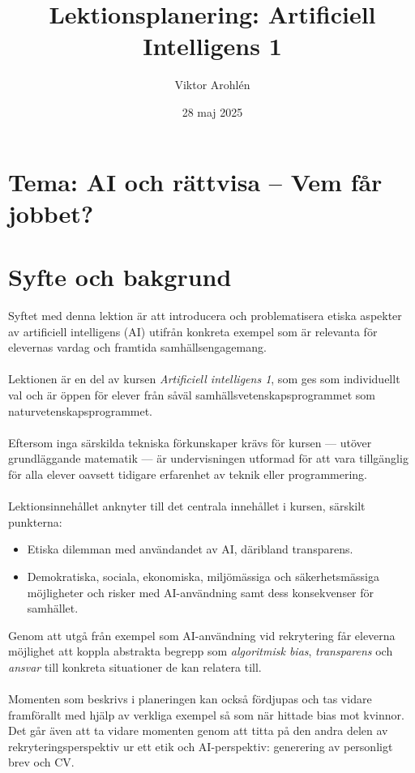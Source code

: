 \documentclass[12pt]{article}
\title{Lektionsplanering: Artificiell Intelligens 1}
\author{Viktor Arohlén}
\date{28 maj 2025}
\begin{document}
\maketitle

\section*{Tema: AI och rättvisa – Vem får jobbet?}

\section*{Syfte och bakgrund}

Syftet med denna lektion är att introducera och problematisera etiska aspekter av 
artificiell intelligens (AI) utifrån konkreta exempel som är relevanta för elevernas 
vardag och framtida samhällsengagemang.
\\\\
Lektionen är en del av kursen \textit{Artificiell intelligens 1}, som ges som 
individuellt val och är öppen för elever från såväl samhällsvetenskapsprogrammet som 
naturvetenskapsprogrammet.
\\\\
Eftersom inga särskilda tekniska förkunskaper krävs för kursen — utöver grundläggande 
matematik — är undervisningen utformad för att vara tillgänglig för alla elever oavsett 
tidigare erfarenhet av teknik eller programmering. 
\\\\
Lektionsinnehållet anknyter till det centrala innehållet i kursen, särskilt punkterna:
\begin{itemize}
    \item Etiska dilemman med användandet av AI, däribland transparens.
    \item Demokratiska, sociala, ekonomiska, miljömässiga och säkerhetsmässiga 
          möjligheter och risker med AI-användning samt dess konsekvenser för samhället.
\end{itemize}
Genom att utgå från exempel som AI-användning vid rekrytering får eleverna möjlighet 
att koppla abstrakta begrepp som \textit{algoritmisk bias}, \textit{transparens} och 
\textit{ansvar} till konkreta situationer de kan relatera till. 
\\\\
Momenten som beskrivs i planeringen kan också fördjupas och tas vidare framförallt med hjälp av verkliga
exempel så som \citeyear{dastin2018amazon} när \citeauthor{dastin2018amazon} hittade bias mot kvinnor. Det går även att ta
vidare momenten genom att titta på den andra delen av rekryteringsperspektiv ur ett etik och AI-perspektiv: generering
av personligt brev och CV.
\end{document}
